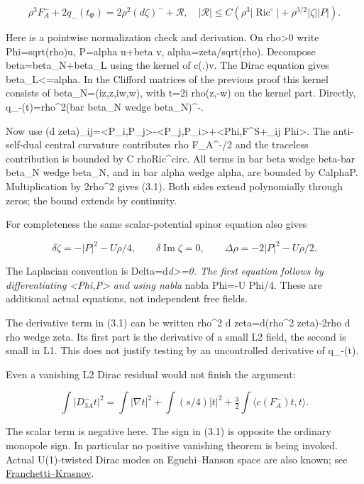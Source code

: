 \documentclass[
  10pt,
]{article}
\begin{document}
\[
 \rho^3F_A^-+2q_-(t_\Phi)=2\rho^2(d\zeta)^-+\mathcal R,
 \quad
 |\mathcal R|\le C\left(\rho^3|\operatorname{Ric}^\circ|
                  +\rho^{3/2}|\zeta||P|\right).       \tag{3.1}
\]

Here is a pointwise normalization check and derivation. On
rho\textgreater0 write Phi=sqrt(rho)u, P=alpha u+beta v,
alpha=zeta/sqrt(rho). Decompose beta=beta\_N+beta\_L using the kernel of
c(.)v. The Dirac equation gives
\textbar beta\_L\textbar\textless=\textbar alpha\textbar. In the
Clifford matrices of the previous proof this kernel consists of
beta\_N=(iz,z,iw,w), with t=2i rho(z,-w) on the kernel part. Directly,
q\_-(t)=rho\^{}2(bar beta\_N wedge beta\_N)\^{}-.

Now use (d
zeta)\_ij=\textless P\_i,P\_j\textgreater-\textless P\_j,P\_i\textgreater+\textless Phi,F\^{}S+\_ij
Phi\textgreater. The anti-self-dual central curvature contributes rho
F\_A\^{}-/2 and the traceless contribution is bounded by C
rho\textbar Ric\^{}circ\textbar. All terms in bar beta wedge beta-bar
beta\_N wedge beta\_N, and in bar alpha wedge alpha, are bounded by
C\textbar alpha\textbar\textbar P\textbar. Multiplication by 2rho\^{}2
gives (3.1). Both sides extend polynomially through zeros; the bound
extends by continuity.

For completeness the same scalar-potential spinor equation also gives

\[
 \delta\zeta=-|P|^2-U\rho/4,\qquad
 \delta\operatorname{Im}\zeta=0,\qquad
 \Delta\rho=-2|P|^2-U\rho/2.                         \tag{3.2}
\]

The Laplacian convention is Delta=d\emph{d\textgreater=0. The first
equation follows by differentiating \textless Phi,P\textgreater{} and
using nabla} nabla Phi=-U Phi/4. These are additional actual equations,
not independent free fields.

The derivative term in (3.1) can be written rho\^{}2 d zeta=d(rho\^{}2
zeta)-2rho d rho wedge zeta. Its first part is the derivative of a small
L2 field, the second is small in L1. This does not justify testing by an
uncontrolled derivative of q\_-(t).

Even a vanishing L2 Dirac residual would not finish the argument:

\[
 \int|D^-_{3A}t|^2=\int|\nabla t|^2+\int(s/4)|t|^2
       +\tfrac32\int\langle c(F_A^-)t,t\rangle.       \tag{3.3}
\]

The scalar term is negative here. The sign in (3.1) is opposite the
ordinary monopole sign. In particular no positive vanishing theorem is
being invoked. Actual U(1)-twisted Dirac modes on Eguchi--Hanson space
are also known; see
\href{https://arxiv.org/abs/2309.08453}{Franchetti--Krasnov}.
\end{document}
